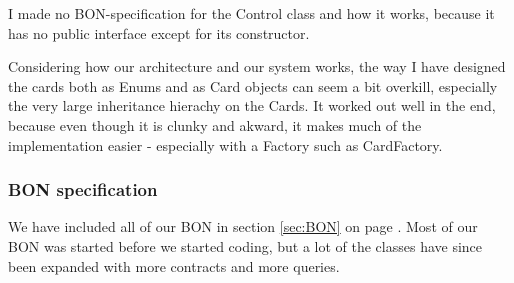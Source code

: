 I made no BON-specification for the Control class and how it works, because it has no public interface except for its constructor.

Considering how our architecture and our system works, the way I have designed the cards both as Enums and as Card objects can seem a bit overkill, especially the very large inheritance hierachy on the Cards. It worked out well in the end, because even though it is clunky and akward, it makes much of the implementation easier - especially with a Factory such as CardFactory.

\subsubsection{BON specification}
We have included all of our BON in section \ref{sec:BON} on page \pageref{sec:BON}. Most of our BON was started before we started coding, but a lot of the classes have since been expanded with more contracts and more queries.